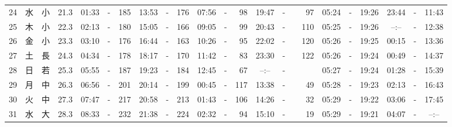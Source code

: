 \documentclass[12pt,a4j]{jsarticle}
\begin{document}
\begin{table}[htbp]
\begin{center}
{\begin{tabular}{|rc|cr|ccrccr|ccrccr|ccc|ccc|}
24 & 水 & 小 & 21.3 &  01:33 &-& 185 &  13:53 &-& 176 &  07:56 &-&  98 &  19:47 &-&  97 & 05:24 & -& 19:26 & 23:44 & -& 11:43 \\
25 & 木 & 小 & 22.3 &  02:13 &-& 180 &  15:05 &-& 166 &  09:05 &-&  99 &  20:43 &-& 110 & 05:25 & -& 19:26 & --:-- & -& 12:38 \\
26 & 金 & 小 & 23.3 &  03:10 &-& 176 &  16:44 &-& 163 &  10:26 &-&  95 &  22:02 &-& 120 & 05:26 & -& 19:25 & 00:15 & -& 13:36 \\
27 & 土 & 長 & 24.3 &  04:34 &-& 178 &  18:17 &-& 170 &  11:42 &-&  83 &  23:30 &-& 122 & 05:26 & -& 19:24 & 00:49 & -& 14:37 \\
28 & 日 & 若 & 25.3 &  05:55 &-& 187 &  19:23 &-& 184 &  12:45 &-&  67 &  --:-- &-&~~~~~ & 05:27 & -& 19:24 & 01:28 & -& 15:39 \\
29 & 月 & 中 & 26.3 &  06:56 &-& 201 &  20:14 &-& 199 &  00:45 &-& 117 &  13:38 &-&  49 & 05:28 & -& 19:23 & 02:13 & -& 16:43 \\
30 & 火 & 中 & 27.3 &  07:47 &-& 217 &  20:58 &-& 213 &  01:43 &-& 106 &  14:26 &-&  32 & 05:29 & -& 19:22 & 03:06 & -& 17:45 \\
31 & 水 & 大 & 28.3 &  08:33 &-& 232 &  21:38 &-& 224 &  02:32 &-&  94 &  15:10 &-&  19 & 05:29 & -& 19:21 & 04:07 & -& --:-- \\
   \hline
   \end{tabular}}
   \end{center}
\end{table}
\newpage
\end{document}
